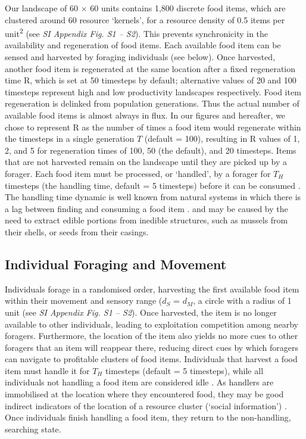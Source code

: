 Our landscape of 60 $\times$ 60 units contains 1,800 discrete food items, which are clustered around 60 resource `kernels', for a resource density of 0.5 items per unit\textsuperscript{2} (see \textit{SI Appendix Fig. S1 -- S2}).
This prevents synchronicity in the availability and regeneration of food items.
Each available food item can be sensed and harvested by foraging individuals (see below).
Once harvested, another food item is regenerated at the same location after a fixed regeneration time R, which is set at 50 timesteps by default; alternative values of 20 and 100 timesteps represent high and low productivity landscapes respectively.
Food item regeneration is delinked from population generations.
Thus the actual number of available food items is almost always in flux.
In our figures and hereafter, we chose to represent R as the number of times a food item would regenerate within the timesteps in a single generation $T$ (default = 100), resulting in R values of 1, 2, and 5 for regeneration times of 100, 50 (the default), and 20 timesteps.
Items that are not harvested remain on the landscape until they are picked up by a forager.
Each food item must be processed, or `handled', by a forager for $T_H$ timesteps (the handling time, default = 5 timesteps) before it can be consumed \autocite{ruxton1992,gupte2021a}.
The handling time dynamic is well known from natural systems in which there is a lag between finding and consuming a food item \autocite{ruxton1992}. and may be caused by the need to extract edible portions from inedible structures, such as mussels from their shells, or seeds from their casings.

\subsection*{Individual Foraging and Movement}

Individuals forage in a randomised order, harvesting the first available food item within their movement and sensory range ($d_S$ = $d_M$, a circle with a radius of 1 unit (see \textit{SI Appendix Fig. S1 -- S2}).
Once harvested, the item is no longer available to other individuals, leading to exploitation competition among nearby foragers.
Furthermore, the location of the item also yields no more cues to other foragers that an item will reappear there, reducing direct cues by which foragers can navigate to profitable clusters of food items.
Individuals that harvest a food item must handle it for $T_H$ timesteps (default = 5 timesteps), while all individuals not handling a food item are considered idle \citep{ruxton1992,gupte2021a}.
As handlers are immobilised at the location where they encountered food, they may be good indirect indicators of the location of a resource cluster (`social information') \autocite[][]{danchin2004,romano2020,gupte2021a}.
Once individuals finish handling a food item, they return to the non-handling, searching state.

